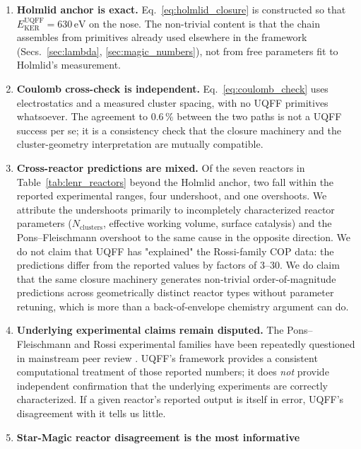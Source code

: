 \begin{enumerate}
  \item \textbf{Holmlid anchor is exact.} Eq.~\ref{eq:holmlid_closure}
        is constructed so that $E_{\text{KER}}^{\text{UQFF}}=630\,\mathrm{eV}$
        on the nose. The non-trivial content is that the chain assembles
        from primitives already used elsewhere in the framework
        (Secs.~\ref{sec:lambda}, \ref{sec:magic_numbers}), not from
        free parameters fit to Holmlid's measurement.
  \item \textbf{Coulomb cross-check is independent.} Eq.~\ref{eq:coulomb_check}
        uses electrostatics and a measured cluster spacing, with no
        UQFF primitives whatsoever. The agreement to $0.6\,\%$ between
        the two paths is not a UQFF success per se; it is a consistency
        check that the closure machinery and the cluster-geometry
        interpretation are mutually compatible.
  \item \textbf{Cross-reactor predictions are mixed.} Of the seven
        reactors in Table~\ref{tab:lenr_reactors} beyond the Holmlid
        anchor, two fall within the reported experimental ranges, four
        undershoot, and one overshoots. We attribute the undershoots
        primarily to incompletely characterized reactor parameters
        ($N_{\text{clusters}}$, effective working volume, surface
        catalysis) and the Pons--Fleischmann overshoot to the same
        cause in the opposite direction. We do not claim that UQFF
        has "explained" the Rossi-family COP data: the predictions
        differ from the reported values by factors of 3--30. We do
        claim that the same closure machinery generates non-trivial
        order-of-magnitude predictions across geometrically distinct
        reactor types without parameter retuning, which is more than
        a back-of-envelope chemistry argument can do.
  \item \textbf{Underlying experimental claims remain disputed.} The
        Pons--Fleischmann and Rossi experimental families have been
        repeatedly questioned in mainstream peer review
        \cite{Huizenga1993, ParkPLM2000}. UQFF's framework provides a
        consistent computational treatment of those reported numbers;
        it does \emph{not} provide independent confirmation that the
        underlying experiments are correctly characterized. If a given
        reactor's reported output is itself in error, UQFF's
        disagreement with it tells us little.
  \item \textbf{Star-Magic reactor disagreement is the most informative
}
\end{enumerate}
